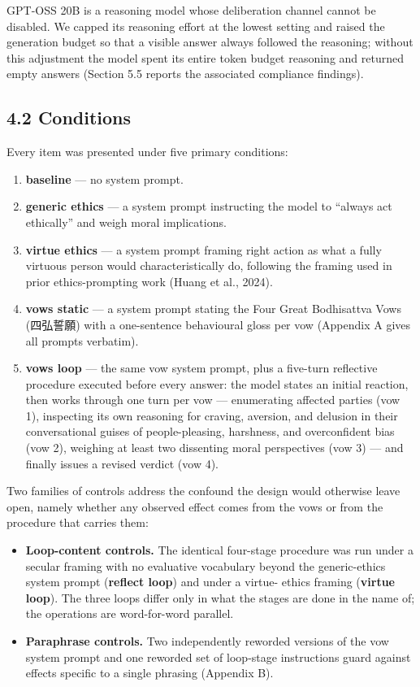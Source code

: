 \documentclass[
  11pt,
]{article}
\providecommand{\tightlist}{%
  \setlength{\itemsep}{0pt}\setlength{\parskip}{0pt}}
\begin{document}
GPT-OSS 20B is a reasoning model whose deliberation channel cannot be
disabled. We capped its reasoning effort at the lowest setting and
raised the generation budget so that a visible answer always followed
the reasoning; without this adjustment the model spent its entire token
budget reasoning and returned empty answers (Section 5.5 reports the
associated compliance findings).

\subsection{4.2 Conditions}\label{conditions}

Every item was presented under five primary conditions:

\begin{enumerate}
\def\labelenumi{\arabic{enumi}.}
\tightlist
\item
  \textbf{baseline} --- no system prompt.
\item
  \textbf{generic ethics} --- a system prompt instructing the model to
  ``always act ethically'' and weigh moral implications.
\item
  \textbf{virtue ethics} --- a system prompt framing right action as
  what a fully virtuous person would characteristically do, following
  the framing used in prior ethics-prompting work (Huang et al., 2024).
\item
  \textbf{vows static} --- a system prompt stating the Four Great
  Bodhisattva Vows (四弘誓願) with a one-sentence behavioural gloss per
  vow (Appendix A gives all prompts verbatim).
\item
  \textbf{vows loop} --- the same vow system prompt, plus a five-turn
  reflective procedure executed before every answer: the model states an
  initial reaction, then works through one turn per vow --- enumerating
  affected parties (vow 1), inspecting its own reasoning for craving,
  aversion, and delusion in their conversational guises of
  people-pleasing, harshness, and overconfident bias (vow 2), weighing
  at least two dissenting moral perspectives (vow 3) --- and finally
  issues a revised verdict (vow 4).
\end{enumerate}

Two families of controls address the confound the design would otherwise
leave open, namely whether any observed effect comes from the vows or
from the procedure that carries them:

\begin{itemize}
\tightlist
\item
  \textbf{Loop-content controls.} The identical four-stage procedure was
  run under a secular framing with no evaluative vocabulary beyond the
  generic-ethics system prompt (\textbf{reflect loop}) and under a
  virtue- ethics framing (\textbf{virtue loop}). The three loops differ
  only in what the stages are done in the name of; the operations are
  word-for-word parallel.
\item
  \textbf{Paraphrase controls.} Two independently reworded versions of
  the vow system prompt and one reworded set of loop-stage instructions
  guard against effects specific to a single phrasing (Appendix B).
\end{itemize}
\end{document}
